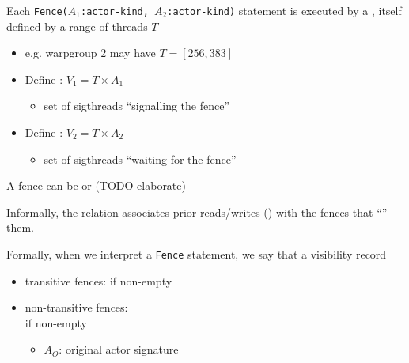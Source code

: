 \newpage
{}

\begin{minipage}[t]{0.48\textwidth}\fixminipage

Each \texttt{Fence($A_1$:\textsf{actor-kind}, $A_2$:\textsf{actor-kind})} statement is executed by a , itself defined by a range of threads $T$

\begin{itemize}
  \item e.g. warpgroup 2 may have $T = [256, 383]$
  \item Define : $V_1 = T \times A_1$
  \begin{itemize}
    \item set of sigthreads ``signalling the fence''
  \end{itemize}
  \item Define : $V_2 = T \times A_2$
  \begin{itemize}
    \item set of sigthreads ``waiting for the fence''
  \end{itemize}
\end{itemize}

A fence can be  or  (TODO elaborate)

Informally, the  relation associates prior reads/writes () with the fences that ``'' them.

Formally, when we interpret a \texttt{Fence} statement, we say that a visibility record 
\begin{itemize}
  \item transitive fences: if  non-empty
  \item non-transitive fences:\\if {} non-empty
  \begin{itemize}
    \item $A_O$: original actor signature
  \end{itemize}
\end{itemize}

\end{minipage}
\hfill

